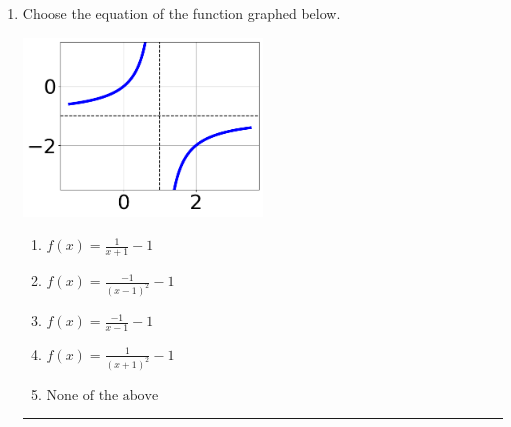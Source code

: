 \documentclass[14pt]{extbook}
\newcommand{\litem}[1]{\item#1\hspace*{-1cm}\rule{\textwidth}{0.4pt}}
\begin{document}
\begin{enumerate}
{\begin{enumerate}[label=\Alph*.]
\end{enumerate} }
\litem{
Choose the equation of the function graphed below.
\begin{center}
    \includegraphics[width=0.5\textwidth]{../Figures/rationalGraphToEquationCopyA.png}
\end{center}
\begin{enumerate}[label=\Alph*.]
\item \( f(x) = \frac{1}{x + 1} - 1 \)
\item \( f(x) = \frac{-1}{(x - 1)^2} - 1 \)
\item \( f(x) = \frac{-1}{x - 1} - 1 \)
\item \( f(x) = \frac{1}{(x + 1)^2} - 1 \)
\item \( \text{None of the above} \)


\end{enumerate}}
\end{enumerate}
\end{document}
